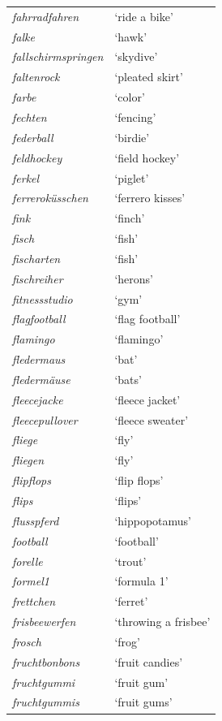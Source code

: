 \begin{longtable}{ll}
\textit{fahrradfahren} & `ride a bike' \\
\textit{falke} & `hawk' \\
\textit{fallschirmspringen} & `skydive' \\
\textit{faltenrock} & `pleated skirt' \\
\textit{farbe} & `color' \\
\textit{fechten} & `fencing' \\
\textit{federball} & `birdie' \\
\textit{feldhockey} & `field hockey' \\
\textit{ferkel} & `piglet' \\
\textit{ferreroküsschen} & `ferrero kisses' \\
\textit{fink} & `finch' \\
\textit{fisch} & `fish' \\
\textit{fischarten} & `fish' \\
\textit{fischreiher} & `herons' \\
\textit{fitnessstudio} & `gym' \\
\textit{flagfootball} & `flag football' \\
\textit{flamingo} & `flamingo' \\
\textit{fledermaus} & `bat' \\
\textit{fledermäuse} & `bats' \\
\textit{fleecejacke} & `fleece jacket' \\
\textit{fleecepullover} & `fleece sweater' \\
\textit{fliege} & `fly' \\
\textit{fliegen} & `fly' \\
\textit{flipflops} & `flip flops' \\
\textit{flips} & `flips' \\
\textit{flusspferd} & `hippopotamus' \\
\textit{football} & `football' \\
\textit{forelle} & `trout' \\
\textit{formel1} & `formula 1' \\
\textit{frettchen} & `ferret' \\
\textit{frisbeewerfen} & `throwing a frisbee' \\
\textit{frosch} & `frog' \\
\textit{fruchtbonbons} & `fruit candies' \\
\textit{fruchtgummi} & `fruit gum' \\
\textit{fruchtgummis} & `fruit gums' \\

\end{longtable}
